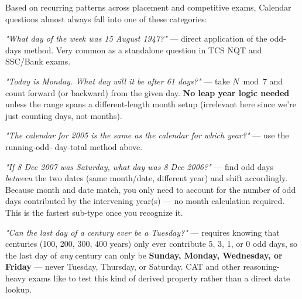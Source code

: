 \documentclass[11pt]{article}
\begin{document}
Based on recurring patterns across placement and competitive exams, Calendar questions almost always
fall into one of these categories:

\begin{formulabox}
\textit{"What day of the week was 15 August 1947?"} --- direct application of the odd-days method.
Very common as a standalone question in TCS NQT and SSC/Bank exams.
\end{formulabox}

\begin{formulabox}
\textit{"Today is Monday. What day will it be after 61 days?"} --- take $N \bmod 7$ and count forward
(or backward) from the given day. \textbf{No leap year logic needed} unless the range spans a
different-length month setup (irrelevant here since we're just counting days, not months).
\end{formulabox}

\begin{formulabox}
\textit{"The calendar for 2005 is the same as the calendar for which year?"} --- use the running-odd-
day-total method above.
\end{formulabox}

\begin{formulabox}
\textit{"If 8 Dec 2007 was Saturday, what day was 8 Dec 2006?"} --- find odd days \emph{between} the
two dates (same month/date, different year) and shift accordingly. Because month and date match, you
only need to account for the number of odd days contributed by the intervening year(s) --- no month
calculation required. This is the fastest sub-type once you recognize it.
\end{formulabox}

\begin{formulabox}
\textit{"Can the last day of a century ever be a Tuesday?"} --- requires knowing that centuries (100,
200, 300, 400 years) only ever contribute 5, 3, 1, or 0 odd days, so the last day of \emph{any}
century can only be \textbf{Sunday, Monday, Wednesday, or Friday} --- never Tuesday, Thursday, or
Saturday. CAT and other reasoning-heavy exams like to test this kind of derived property rather than
a direct date lookup.
\end{formulabox}
\end{document}
